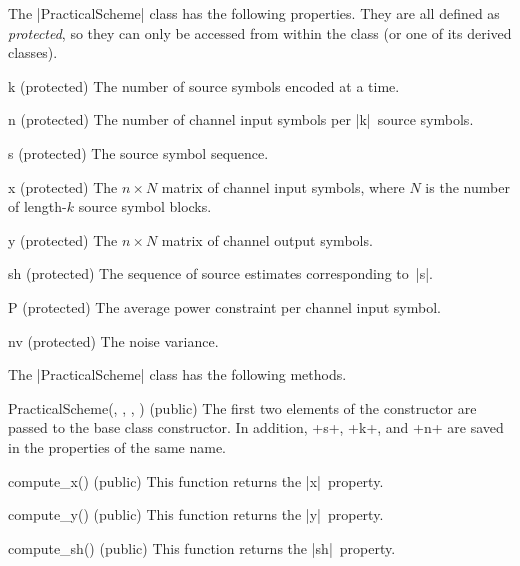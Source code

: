 The |PracticalScheme| class has the following properties. They are all defined
as \emph{protected}, so they can only be accessed from within the class (or one
of its derived classes).
\begin{property}{k (protected)}
  The number of source symbols encoded at a time.
\end{property}
\begin{property}{n (protected)}
  The number of channel input symbols per |k|~source symbols.
\end{property}
\begin{property}{s (protected)}
  The source symbol sequence.
\end{property}
\begin{property}{x (protected)}
  The $n \times N$ matrix of channel input symbols, where $N$
  is the number of length-$k$ source symbol blocks. 
\end{property}
\begin{property}{y (protected)}
  The $n \times N$ matrix of channel output symbols. 
\end{property}
\begin{property}{sh (protected)}
  The sequence of source estimates corresponding to~|s|.
\end{property}
\begin{property}{P (protected)}
  The average power constraint per channel input symbol.
\end{property}
\begin{property}{nv (protected)}
  The noise variance.
\end{property}

The |PracticalScheme| class has the following methods.
\begin{method}{PracticalScheme(, , , )
  (public)}
  The first two elements of the constructor are passed to the base class
  constructor. In addition, +s+, +k+, and +n+ are saved in the properties of the
  same name. 
\end{method}

\begin{method}{compute\_x(\obj) (public)}
  This function returns the |x|~property.
\end{method}
\begin{method}{compute\_y(\obj) (public)}
  This function returns the |y|~property.
\end{method}
\begin{method}{compute\_sh(\obj) (public)}
  This function returns the |sh|~property.
\end{method}

